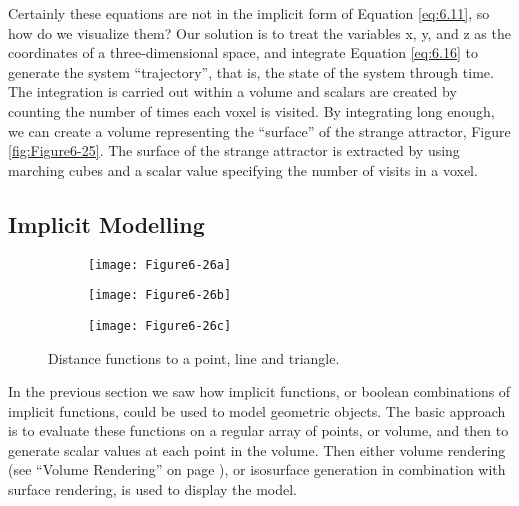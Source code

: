 Certainly these equations are not in the implicit form of Equation \ref{eq:6.11}, so how do we visualize them? Our solution is to treat the variables x, y, and z as the coordinates of a three-dimensional space, and integrate Equation \ref{eq:6.16} to generate the system ``trajectory'', that is, the state of the system through time. The integration is carried out within a volume and scalars are created by counting the number of times each voxel is visited. By integrating long enough, we can create a volume representing the ``surface'' of the strange attractor, Figure \ref{fig:Figure6-25}. The surface of the strange attractor is extracted by using marching cubes and a scalar value specifying the number of visits in a voxel.

\subsection{Implicit Modelling}
\label{subsec:implicit_modelling}

\begin{figure}[htb]
	\begin{subfigure}[h]{0.24\linewidth}
		\texttt{[image: Figure6-26a]}
		\label{fig:Figure6-26a}
	\end{subfigure}
	\hfill
	\begin{subfigure}[h]{0.24\linewidth}
		\texttt{[image: Figure6-26b]}
		\label{fig:Figure6-26b}
	\end{subfigure}
	\hfill
	\begin{subfigure}[h]{0.24\linewidth}
		\texttt{[image: Figure6-26c]}
		\label{fig:Figure6-26c}
	\end{subfigure}
	\caption{Distance functions to a point, line and triangle.}\label{fig:Figure6-26}
\end{figure}

In the previous section we saw how implicit functions, or boolean combinations of implicit functions, could be used to model geometric objects. The basic approach is to evaluate these functions on a regular array of points, or volume, and then to generate scalar values at each point in the volume. Then either volume rendering (see ``Volume Rendering'' on page \pageref{sec:volume_rendering} ), or isosurface generation in combination with surface rendering, is used to display the model.

